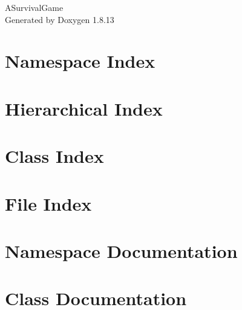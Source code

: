 \documentclass[twoside]{book}
\newcommand{\+}{\discretionary{\mbox{\scriptsize$\hookleftarrow$}}{}{}}
\newcommand{\clearemptydoublepage}{%
  \newpage{\pagestyle{empty}\cleardoublepage}%
}
\begin{document}
\hypersetup{pageanchor=false,
             bookmarksnumbered=true,
             pdfencoding=unicode
            }
\begin{titlepage}
\vspace*{7cm}
\begin{center}%
{\Large A\+Survival\+Game }\\
\vspace*{1cm}
{\large Generated by Doxygen 1.8.13}\\
\end{center}
\end{titlepage}
\clearemptydoublepage
{}
\tableofcontents
\clearemptydoublepage
{}
\hypersetup{pageanchor=true}

\chapter{Namespace Index}

\chapter{Hierarchical Index}

\chapter{Class Index}

\chapter{File Index}

\chapter{Namespace Documentation}






\chapter{Class Documentation}





























\end{document}
